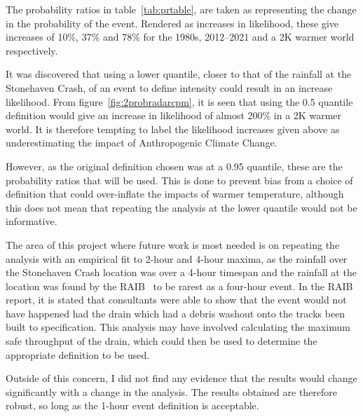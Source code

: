 \documentclass[12pt,a4paper,openany]{report}
\begin{document}

The probability ratios in table~\ref{tab:prtable},
    are taken as representing the change in the probability of the event.
Rendered as increases in likelihood,
    these give increases of 10\%, 37\% and 78\% for the 1980s, 2012--2021 and a 2K warmer world respectively.

It was discovered that using a lower quantile,
    closer to that of the rainfall at the Stonehaven Crash,
    of an event to define intensity could result in an increase likelihood.
From figure~\ref{fig:2probradarcpm},
    it is seen that using the 0.5 quantile definition would give an increase
    in likelihood of almost 200\% in a 2K warmer world.
It is therefore tempting to label the likelihood increases given above as underestimating
    the impact of Anthropogenic Climate Change.

However,
    as the original definition chosen was at a 0.95 quantile,
    these are the probability ratios that will be used.
This is done to prevent bias from a choice of definition that could over-inflate
    the impacts of warmer temperature,
    although this does not mean that repeating the analysis at the lower quantile would not be informative.

The area of this project where future work is most needed is on repeating the analysis
    with an empirical fit to 2-hour and 4-hour maxima,
    as the rainfall over the Stonehaven Crash location was over a 4-hour timespan
    and the rainfall at the location was found by the RAIB~\cite{RAIB_2022}
    to be rarest as a four-hour event.
In the RAIB report,
    it is stated that consultants were able to show that the event would not have happened
    had the drain which had a debris washout onto the tracks been built to specification.
This analysis may have involved calculating the maximum safe throughput of the drain,
    which could then be used to determine the appropriate definition to be used.

Outside of this concern,
    I did not find any evidence that the results would change significantly
    with a change in the analysis.
The results obtained are therefore robust,
    so long as the 1-hour event definition is acceptable.
\end{document}
